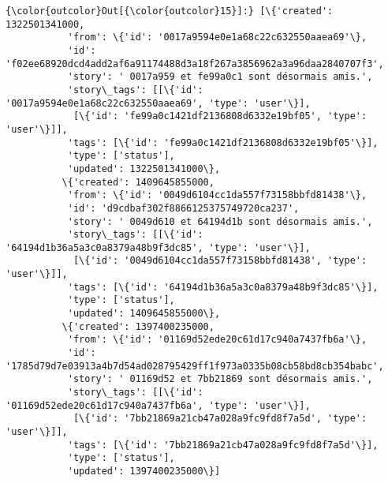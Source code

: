 \documentclass[11pt]{article}
\begin{document}
\begin{Verbatim}[commandchars=\\\{\}]
{\color{outcolor}Out[{\color{outcolor}15}]:} [\{'created': 1322501341000,
           'from': \{'id': '0017a9594e0e1a68c22c632550aaea69'\},
           'id': 'f02ee68920dcd4add2af6a91174488d3a18f267a3856962a3a96daa2840707f3',
           'story': ' 0017a959 et fe99a0c1 sont désormais amis.',
           'story\_tags': [[\{'id': '0017a9594e0e1a68c22c632550aaea69', 'type': 'user'\}],
            [\{'id': 'fe99a0c1421df2136808d6332e19bf05', 'type': 'user'\}]],
           'tags': [\{'id': 'fe99a0c1421df2136808d6332e19bf05'\}],
           'type': ['status'],
           'updated': 1322501341000\},
          \{'created': 1409645855000,
           'from': \{'id': '0049d6104cc1da557f73158bbfd81438'\},
           'id': 'd9cdbaf302f8866125375749720ca237',
           'story': ' 0049d610 et 64194d1b sont désormais amis.',
           'story\_tags': [[\{'id': '64194d1b36a5a3c0a8379a48b9f3dc85', 'type': 'user'\}],
            [\{'id': '0049d6104cc1da557f73158bbfd81438', 'type': 'user'\}]],
           'tags': [\{'id': '64194d1b36a5a3c0a8379a48b9f3dc85'\}],
           'type': ['status'],
           'updated': 1409645855000\},
          \{'created': 1397400235000,
           'from': \{'id': '01169d52ede20c61d17c940a7437fb6a'\},
           'id': '1785d79d7e03913a4b7d54ad028795429ff1f973a0335b08cb58bd8cb354babc',
           'story': ' 01169d52 et 7bb21869 sont désormais amis.',
           'story\_tags': [[\{'id': '01169d52ede20c61d17c940a7437fb6a', 'type': 'user'\}],
            [\{'id': '7bb21869a21cb47a028a9fc9fd8f7a5d', 'type': 'user'\}]],
           'tags': [\{'id': '7bb21869a21cb47a028a9fc9fd8f7a5d'\}],
           'type': ['status'],
           'updated': 1397400235000\}]
\end{Verbatim}
            

    
    
    
    
\end{document}
